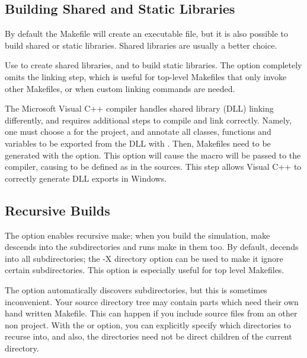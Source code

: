 \subsection{Building Shared and Static Libraries}
\label{sec:build-sim-progs:building-shared-and-static-libraries}

By default the Makefile will create an executable file, but it is also
possible to build shared or static libraries. Shared libraries
are usually a better choice.

Use  to create shared libraries, and 
to build static libraries. The  option completely omits
the linking step, which is useful for top-level Makefiles that only invoke
other Makefiles, or when custom linking commands are needed.

\ifcommercial
\begin{note}
The Microsoft Visual C++ compiler handles shared library (DLL) linking
differently, and requires additional steps to compile and link correctly.
Namely, one must choose a  for the project, and annotate all classes,
functions and variables to be exported from the DLL with .
Then, Makefiles need to be generated with the  option.
This option will cause the  macro will be passed to
the compiler, causing  to be defined as  in
the sources. This step allows Visual C++ to correctly generate DLL exports in Windows.
\end{note}
\fi


\subsection{Recursive Builds}
\label{sec:build-sim-progs:recursive-builds}


The  option enables recursive make; when you build the simulation, make
descends into the subdirectories and runs make in them too.
By default,  decends into all subdirectories; the -X directory option
can be used to make it ignore certain subdirectories. This option is especially useful
for top level Makefiles.


The  option automatically discovers subdirectories, but this
is sometimes inconvenient. Your source directory tree may contain
parts which need their own hand written Makefile. This can happen if
you include source files from an other non {\opp} project. With the 
or  option, you can explicitly specify which directories to
recurse into, and also, the directories need not be direct children of the
current directory.


